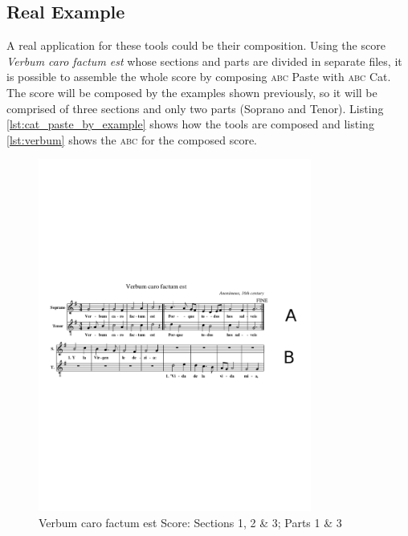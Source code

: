 \documentclass[a4paper,UKenglish]{oasics}
\newcommand{\abc}{\textsc{abc}}
\begin{document}


\subsection{Real Example}
A real application for these tools could be their composition. Using the score \textit{Verbum caro
factum est} whose sections and parts are divided in separate files, it is possible to assemble the
whole score by composing \abc{} Paste with \abc{} Cat. The score will be composed by the examples
shown previously, so it will be comprised of three sections and only two parts (Soprano and Tenor).
Listing \ref{lst:cat_paste_by_example} shows how the tools are composed and listing \ref{lst:verbum}
shows the \abc{} for the composed score.





\vspace{-1.30cm}
\begin{figure}[htb]
  \centering 
  \includegraphics[width=0.8\textwidth, clip=true, trim = 0mm 105mm 0mm 76mm]{img/c_letters.pdf} 
  \caption{Verbum caro factum est Score: Sections 1, 2 \& 3; Parts 1 \& 3}
  \label{fig:verbum}
\end{figure}
\end{document}

